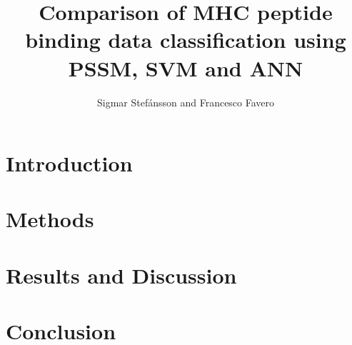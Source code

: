 \documentclass{bioinfo}
\begin{document}
\begin{application}

\title[PSSM,ANN,SVM]{Comparison of MHC peptide binding data classification using PSSM, SVM and ANN}
\author[Sigmar Stef\'{a}nsson, Francesco Favero]{Sigmar Stef\'{a}nsson and Francesco Favero}

\address{Danmarks Tekniske Univeristet}



\maketitle

\begin{abstract}

   


\end{abstract}

\section*{Introduction}
   


\section*{Methods}
   


\section*{Results and Discussion}
   



%   

\section*{Conclusion}
   
\newpage





%
%
%
%
%






\end{application}
\end{document}
